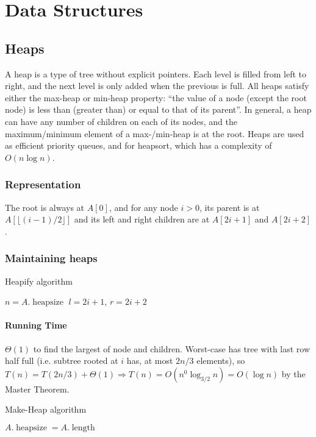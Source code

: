 \documentclass[10pt]{article}
\begin{document}
\section{Data Structures}
\subsection{Heaps}
A heap is a type of tree without explicit pointers.  Each level is filled from left to right, and the next level is only added when the previous is full.  All heaps satisfy either the max-heap or min-heap property: ``the value of a node (except the root node) is less than (greater than) or equal to that of its parent''.  In general, a heap can have any number of children on each of its nodes, and the maximum/minimum element of a max-/min-heap is at the root.  Heaps are used as efficient priority queues, and for heapsort, which has a complexity of $O(n\log n)$.
\subsubsection{Representation}
The root is always at $A[0]$, and for any node $i>0$, its parent is at $A[\lfloor(i-1)/2\rfloor]$ and its left and right children are at $A[2i+1]$ and $A[2i+2]$.
\subsubsection{Maintaining heaps}
\begin{algorithm}
	\caption{Heapify algorithm}
	$n=A.\mathop{heapsize}$\;
	$l=2i+1$, $r=2i+2$\;
\end{algorithm}
\paragraph{Running Time}$\Theta(1)$ to find the largest of node and children.  Worst-case has tree with last row half full (i.e. subtree rooted at $i$ has, at most $2n/3$ elements), so $T(n)=T(2n/3)+\Theta(1)\Rightarrow T(n)=O(n^0\log_{3/2}n)=O(\log n)$ by the Master Theorem.
\begin{algorithm}
	\caption{Make-Heap algorithm}
	$A.\mathop{heapsize}=A.\mathop{length}$\;
\end{algorithm}
\end{document}
